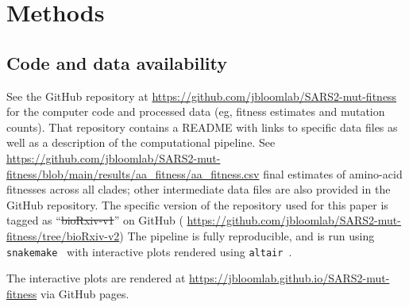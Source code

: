 \documentclass[9pt,twocolumn,twoside]{gsajnl_modified}
\providecommand{\DIFadd}[1]{{\protect\color{blue}\uwave{#1}}} %
\providecommand{\DIFdel}[1]{{\protect\color{red}\sout{#1}}}                      %
\providecommand{\DIFaddbegin}{} %
\providecommand{\DIFaddend}{} %
\providecommand{\DIFdelbegin}{} %
\providecommand{\DIFdelend}{} %
\begin{document}
{\small

\section{Methods}
\subsection{Code and data availability}
See the GitHub repository at \url{https://github.com/jbloomlab/SARS2-mut-fitness} for the computer code and processed data (eg, fitness estimates and mutation counts).
That repository contains a README with links to specific data files as well as a description of the computational pipeline.
See \url{https://github.com/jbloomlab/SARS2-mut-fitness/blob/main/results/aa_fitness/aa_fitness.csv} final estimates of amino-acid fitnesses across all clades; other intermediate data files are also provided in the GitHub repository.
The specific version of the repository used for this paper is tagged as ``\DIFdelbegin \DIFdel{bioRxiv-v1}\DIFdelend \DIFaddbegin \DIFadd{bioRxiv-v2}\DIFaddend '' on GitHub (\DIFdelbegin %
\DIFdelend \DIFaddbegin \url{https://github.com/jbloomlab/SARS2-mut-fitness/tree/bioRxiv-v2}\DIFaddend )
The pipeline is fully reproducible, and is run using \texttt{snakemake}~\citep{molder2021sustainable} with interactive plots rendered using \texttt{altair}~\citep{vanderplas2018altair}.

The interactive plots are rendered at \url{https://jbloomlab.github.io/SARS2-mut-fitness} via GitHub pages.

}
\end{document}
